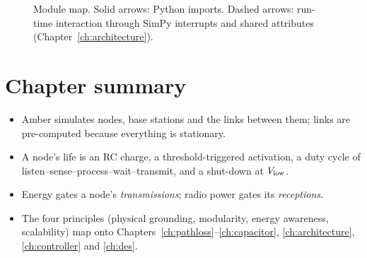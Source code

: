 \begin{figure}[t]
\centering
{}
\caption{Module map. Solid arrows: Python imports. Dashed arrows: run-time interaction through SimPy interrupts and shared attributes (Chapter~\ref{ch:architecture}).}
\label{fig:modulemap}
\end{figure}

\section{Chapter summary}
\begin{itemize}
 \item Amber simulates nodes, base stations and the links between them; links are pre-computed because everything is stationary.
 \item A node's life is an RC charge, a threshold-triggered activation, a duty cycle of listen--sense--process--wait--transmit, and a shut-down at $V_{\mathrm{low}}$.
 \item Energy gates a node's \emph{transmissions}; radio power gates its \emph{receptions}.
 \item The four principles (physical grounding, modularity, energy awareness, scalability) map onto Chapters~\ref{ch:pathloss}--\ref{ch:capacitor}, \ref{ch:architecture}, \ref{ch:controller} and \ref{ch:des}.
\end{itemize}

